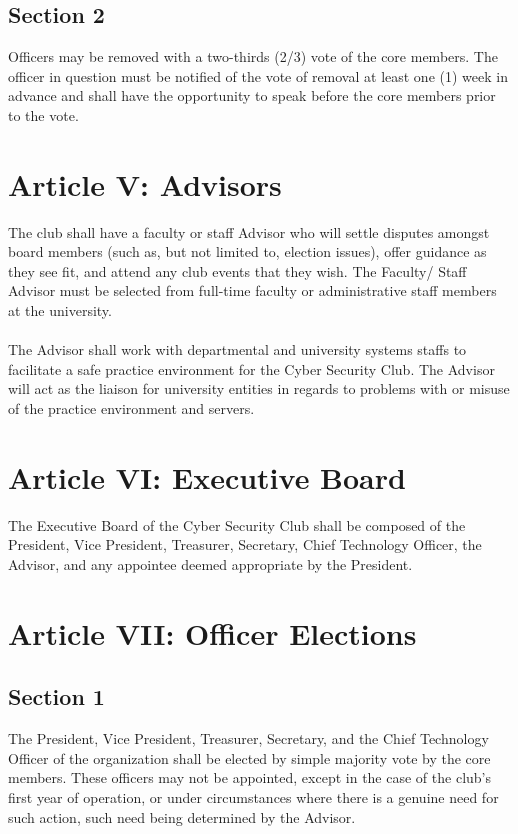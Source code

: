 \documentclass[10pt]{article}
\begin{document}
\subsection*{Section 2}
Officers may be removed with a two-thirds (2/3) vote of the core members. The officer in question
must be notified of the vote of removal at least one (1) week in advance and shall have the opportunity
to speak before the core members prior to the vote.
\vspace{0.2in}

\section*{Article V: Advisors}
The club shall have a faculty or staff Advisor who will settle disputes amongst board members (such as,
but not limited to, election issues), offer guidance as they see fit, and attend any club events that they
wish. The Faculty/ Staff Advisor must be selected from full-time faculty or administrative staff
members at the university.\\\\
The Advisor shall work with departmental and university systems staffs to facilitate a safe practice
environment for the Cyber Security Club. The Advisor will act as the liaison for university entities in
regards to problems with or misuse of the practice environment and servers.
\vspace{0.2in}

\section*{Article VI: Executive Board}
The Executive Board of the Cyber Security Club shall be composed of the President, Vice President,
Treasurer, Secretary, Chief Technology Officer, the Advisor, and any appointee deemed appropriate by
the President.
\vspace{0.2in}

\section*{Article VII: Officer Elections}
\subsection*{Section 1}
The President, Vice President, Treasurer, Secretary, and the Chief Technology Officer of the
organization shall be elected by simple majority vote by the core members. These officers may not be
appointed, except in the case of the club's first year of operation, or under circumstances where there is
a genuine need for such action, such need being determined by the Advisor.
\end{document}
